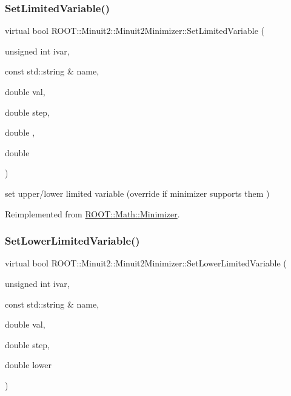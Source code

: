 \subsubsection{\texorpdfstring{SetLimitedVariable()}{SetLimitedVariable()}\hspace{0.1cm}{\footnotesize\ttfamily [2/2]}}
{\footnotesize\ttfamily virtual bool R\+O\+O\+T\+::\+Minuit2\+::\+Minuit2\+Minimizer\+::\+Set\+Limited\+Variable (\begin{DoxyParamCaption}\item[{unsigned int}]{ivar,  }\item[{const std\+::string \&}]{name,  }\item[{double}]{val,  }\item[{double}]{step,  }\item[{double}]{,  }\item[{double}]{ }\end{DoxyParamCaption})\hspace{0.3cm}{\ttfamily [virtual]}}



set upper/lower limited variable (override if minimizer supports them ) 



Reimplemented from \mbox{\hyperlink{classROOT_1_1Math_1_1Minimizer_a4303530cbb62ceb7cf9c9ebcbde530c2}{R\+O\+O\+T\+::\+Math\+::\+Minimizer}}.

\mbox{\label{classROOT_1_1Minuit2_1_1Minuit2Minimizer_af38926946e36f7030cfc1c298ab9b222}} 
\subsubsection{\texorpdfstring{SetLowerLimitedVariable()}{SetLowerLimitedVariable()}\hspace{0.1cm}{\footnotesize\ttfamily [1/2]}}
{\footnotesize\ttfamily virtual bool R\+O\+O\+T\+::\+Minuit2\+::\+Minuit2\+Minimizer\+::\+Set\+Lower\+Limited\+Variable (\begin{DoxyParamCaption}\item[{unsigned int}]{ivar,  }\item[{const std\+::string \&}]{name,  }\item[{double}]{val,  }\item[{double}]{step,  }\item[{double}]{lower }\end{DoxyParamCaption})\hspace{0.3cm}{\ttfamily [virtual]}}



